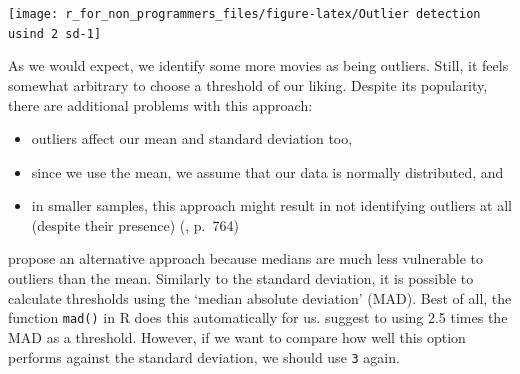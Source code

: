 \documentclass[
]{book}
\begin{document}
\begin{center}\texttt{[image: r\_for\_non\_programmers\_files/figure-latex/Outlier detection usind 2 sd-1]} \end{center}

As we would expect, we identify some more movies as being outliers. Still, it feels somewhat arbitrary to choose a threshold of our liking. Despite its popularity, there are additional problems with this approach:

\begin{itemize}
\item
  outliers affect our mean and standard deviation too,
\item
  since we use the mean, we assume that our data is normally distributed, and
\item
  in smaller samples, this approach might result in not identifying outliers at all (despite their presence) (\citet{leys2013detecting}, p.~764)
\end{itemize}

\citet{leys2013detecting} propose an alternative approach because medians are much less vulnerable to outliers than the mean. Similarly to the standard deviation, it is possible to calculate thresholds using the `median absolute deviation' (MAD). Best of all, the function \texttt{mad()} in R does this automatically for us. \citet{leys2013detecting} suggest to using 2.5 times the MAD as a threshold. However, if we want to compare how well this option performs against the standard deviation, we should use \texttt{3} again.
\end{document}
